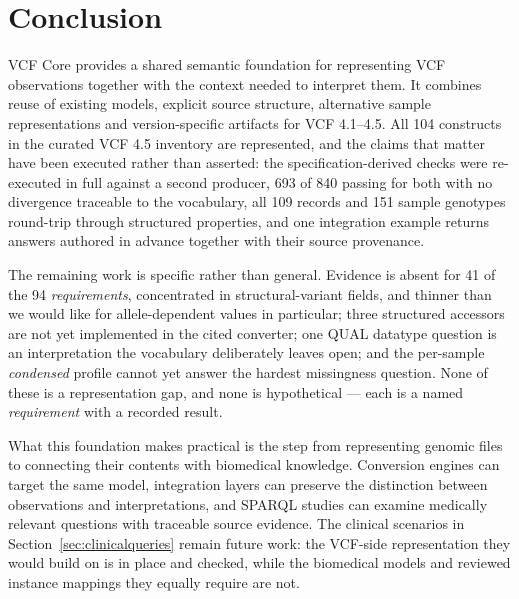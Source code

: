 \documentclass{ceurart}
\begin{document}








\section{Conclusion}

VCF Core provides a shared semantic foundation for representing VCF observations together with the context needed to interpret them. 
It combines reuse of existing models, explicit source structure, alternative sample representations and version-specific artifacts for VCF 4.1--4.5. 
All 104 constructs in the curated VCF 4.5 inventory are represented, and the claims that matter have been executed rather than asserted: the specification-derived checks were re-executed in full against a second producer, 693 of 840 passing for both with no divergence traceable to the vocabulary, all 109 records and 151 sample genotypes round-trip through structured properties, and one integration example returns answers authored in advance together with their source provenance.

The remaining work is specific rather than general. 
Evidence is absent for 41 of the 94 \emph{requirements}, concentrated in structural-variant fields, and thinner than we would like for allele-dependent values in particular; three structured accessors are not yet implemented in the cited converter; one QUAL datatype question is an interpretation the vocabulary deliberately leaves open; and the per-sample \textit{condensed} profile cannot yet answer the hardest missingness question. 
None of these is a representation gap, and none is hypothetical --- each is a named \emph{requirement} with a recorded result.

What this foundation makes practical is the step from representing genomic files to connecting their contents with biomedical knowledge. 
Conversion engines can target the same model, integration layers can preserve the distinction between observations and interpretations, and SPARQL studies can examine medically relevant questions with traceable source evidence. 
The clinical scenarios in Section~\ref{sec:clinicalqueries} remain future work: the VCF-side representation they would build on is in place and checked, while the biomedical models and reviewed instance mappings they equally require are not.
\end{document}

